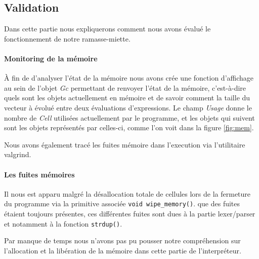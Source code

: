 \subsection{Validation}
Dans cette partie nous expliquerons comment nous avons évalué le fonctionnement de notre ramasse-miette.

\paragraph{Monitoring de la mémoire}
À fin de d'analyser l'état de la mémoire nous avons crée une fonction d'affichage au sein de l'objet \emph{Gc} permettant de renvoyer l'état de la mémoire, c'est-à-dire quels sont les objets actuellement en mémoire et de savoir comment la taille du vecteur à évolué entre deux évaluations d'expressions. Le champ \emph{Usage} donne le nombre de \emph{Cell} utilisées actuellement par le programme, et les objets qui suivent sont les objets représentés par celles-ci, comme l'on voit dans la figure \ref{fig:mem}.

Nous avons également tracé les fuites mémoire dans l'execution via l'utilitaire valgrind.

\paragraph{Les fuites mémoires}
Il nous est apparu malgré la désallocation totale de cellules lors de la fermeture du programme via la primitive associée
\lstinline{void wipe_memory()}.
que des fuites étaient toujours présentes, ces différentes fuites sont dues à la partie lexer/parser et notamment à la fonction \lstinline{strdup()}.

Par manque de temps nous n'avons pas pu pousser notre compréhension sur l'allocation et la libération de la mémoire dans cette partie de l'interpréteur.
